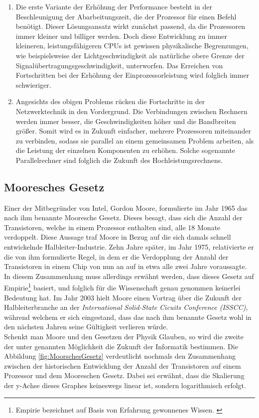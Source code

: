 			\begin{enumerate}
				\item Die erste Variante der Erhöhung der Performance besteht in der Beschleunigung der Abarbeitungszeit, die der Prozessor für einen Befehl benötigt. Dieser Lösungsansatz wirkt zunächst passend, da die Prozessoren immer kleiner und billiger werden. Doch diese Entwicklung zu immer kleineren, leistungsfähigeren CPUs ist gewissen physikalische Begrenzungen, wie beispielsweise der Lichtgeschwindigkeit als natürliche obere Grenze der Signalübertragungsgeschwindigkeit, unterworfen. Das Erreichen von Fortschritten bei der Erhöhung der Einprozessorleistung wird folglich immer schwieriger. \cite{GrundlagenParallelisierung}
				\item Angesichts des obigen Problems rücken die Fortschritte in der Netzwerktechnik in den Vordergrund. Die Verbindungen zwischen Rechnern werden immer besser, die Geschwindigkeiten höher und die Bandbreiten größer. Somit wird es in Zukunft einfacher, mehrere Prozessoren miteinander zu verbinden, sodass sie parallel an einem gemeinsamen Problem arbeiten, als die Leistung der einzelnen Komponenten zu erhöhen. \cite{GrundlagenParallelisierung} Solche sogenannte Parallelrechner sind folglich die Zukunft des Hochleistungsrechnens.
			\end{enumerate}

		\subsection{Mooresches Gesetz}
		
			Einer der Mitbegründer von Intel, Gordon Moore, formulierte im Jahr 1965 das nach ihm benannte Mooresche Gesetz. Dieses besagt, dass sich die Anzahl der Transistoren, welche in einem Prozessor enthalten sind, alle 18 Monate verdoppelt. Diese Aussage traf Moore in Bezug auf die sich damals schnell entwickelnde Halbleiter-Industrie. Zehn Jahre später, im Jahr 1975, relativierte er die von ihm formulierte Regel, in dem er die Verdopplung der Anzahl der Transistoren in einem Chip von nun an auf in etwa alle zwei Jahre voraussagte. In diesem Zusammenhang muss allerdings erwähnt werden, dass dieses Gesetz auf Empirie\footnote{Empirie bezeichnet auf Basis von Erfahrung gewonnenes Wissen. \cite{EmpirieDuden}} basiert, und folglich für die Wissenschaft genau genommen keinerlei Bedeutung hat.
			Im Jahr 2003 hielt Moore einen Vortrag über die Zukunft der Halbleiterbranche an der \textit{International Solid-State Cicuits Conference (ISSCC)}, während welchem er sich eingestand, dass das nach ihm benannte Gesetz wohl in den nächsten Jahren seine Gültigkeit verlieren würde. \cite{EndeHardwareMiniaturisierung}\\
			Schenkt man Moore und den Gesetzen der Physik Glauben, so wird die zweite der unter  genannten Möglichkeit die Zukunft der Informatik bestimmen.
			Die Abbildung \autoref{fig:MoorschesGesetz} verdeutlicht nochmals den Zusammenhang zwischen der historischen Entwicklung der Anzahl der Transistoren auf einem Prozessor und dem Mooreschen Gesetz. Dabei sei erwähnt, dass die Skalierung der y-Achse dieses Graphes keineswegs linear ist, sondern logarithmisch erfolgt.
		
